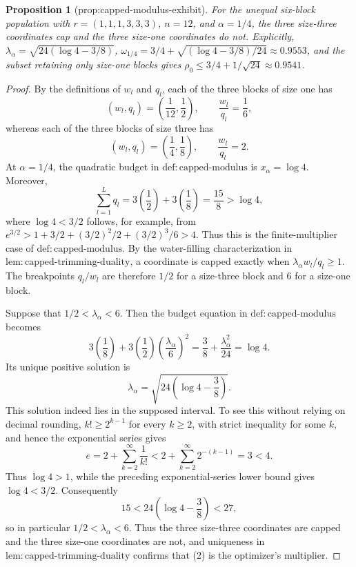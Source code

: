 \documentclass{article}
\newtheorem{proposition}{Proposition}
\begin{document}
\begin{proposition}[prop:capped-modulus-exhibit]\label{prop:capped-modulus-exhibit}
For the unequal six-block population with \(r=(1,1,1,3,3,3)\), \(n=12\), and \(\alpha=1/4\), the three size-three coordinates cap and the three size-one coordinates do not. Explicitly, \(\lambda_\alpha=\sqrt{24(\log4-3/8)}\), \(\omega_{1/4}=3/4+\sqrt{(\log4-3/8)/24}\approx0.9553\), and the subset retaining only size-one blocks gives \(\rho_0\le3/4+1/\sqrt{24}\approx0.9541\).
\end{proposition}
\begin{proof}
By the definitions of \(w_l\) and \(q_l\), each of the three blocks of size one has
\[
 (w_l,q_l)=\left(\frac{1}{12},\frac{1}{2}\right),
 \qquad \frac{w_l}{q_l}=\frac{1}{6},
\]
whereas each of the three blocks of size three has
\[
 (w_l,q_l)=\left(\frac{1}{4},\frac{1}{8}\right),
 \qquad \frac{w_l}{q_l}=2.
\tag{1}
\]
At \(\alpha=1/4\), the quadratic budget in \(\mathrm{def{:}capped\text{-}modulus}\) is \(x_\alpha=\log 4\).  Moreover,
\[
 \sum_{l=1}^L q_l=3\left(\frac12\right)+3\left(\frac18\right)=\frac{15}{8}>\log4,
\]
where \(\log4<3/2\) follows, for example, from
\(e^{3/2}>1+3/2+(3/2)^2/2+(3/2)^3/6>4\).
Thus this is the finite-multiplier case of
\(\mathrm{def{:}capped\text{-}modulus}\).  By the water-filling characterization in
\(\mathrm{lem{:}capped\text{-}trimming\text{-}duality}\), a coordinate is capped exactly when
\(\lambda_\alpha w_l/q_l\ge 1\).  The breakpoints \(q_l/w_l\) are therefore \(1/2\) for a size-three block and \(6\) for a size-one block.

Suppose that \(1/2<\lambda_\alpha<6\).  Then the budget equation in
\(\mathrm{def{:}capped\text{-}modulus}\) becomes
\[
 3\left(\frac18\right)
 +3\left(\frac12\right)\left(\frac{\lambda_\alpha}{6}\right)^2
 =\frac38+\frac{\lambda_\alpha^2}{24}
 =\log4.
\]
Its unique positive solution is
\[
 \lambda_\alpha=\sqrt{24\left(\log4-\frac38\right)}.
\tag{2}
\]
This solution indeed lies in the supposed interval.  To see this without relying on decimal rounding, \(k!\ge 2^{k-1}\) for every \(k\ge2\), with strict inequality for some \(k\), and hence the exponential series gives
\[
 e=2+\sum_{k=2}^{\infty}\frac1{k!}
 <2+\sum_{k=2}^{\infty}2^{-(k-1)}=3<4.
\]
Thus \(\log4>1\), while the preceding exponential-series lower bound gives \(\log4<3/2\).  Consequently
\[
 15<24\left(\log4-\frac38\right)<27,
\]
so in particular \(1/2<\lambda_\alpha<6\).  Thus the three size-three coordinates are capped and the three size-one coordinates are not, and uniqueness in
\(\mathrm{lem{:}capped\text{-}trimming\text{-}duality}\) confirms that (2) is the optimizer's multiplier.


\end{proof}
\end{document}
